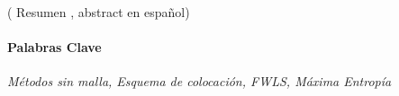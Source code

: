 
( Resumen , abstract en español)

\paragraph{Palabras Clave} \emph{Métodos sin malla, Esquema de colocación, FWLS, Máxima Entropía}